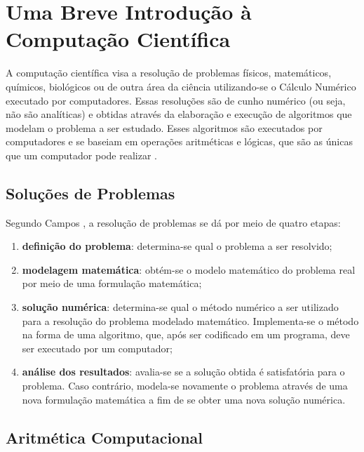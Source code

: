 \chapter{Uma Breve Introdução à Computação Científica}

    \label{cap:cientComp}

    A computação científica visa a resolução de problemas físicos, matemáticos, químicos, biológicos 
    ou de outra área da ciência utilizando-se o Cálculo Numérico executado por computadores. Essas resoluções
    são de cunho numérico (ou seja, não são analíticas) e obtidas através da elaboração e execução de algoritmos
    que modelam o problema a ser estudado. Esses algoritmos são executados por computadores e se baseiam em 
    operações aritméticas e lógicas, que são as únicas que um computador pode realizar \cite{fred}.

    \section{Soluções de Problemas}
    
        Segundo Campos \cite{fred}, a resolução de problemas se dá por meio de quatro etapas:
        \begin{enumerate}
            \item \textbf{definição do problema}: determina-se qual o problema a ser resolvido;
            \item \textbf{modelagem matemática}: obtém-se o modelo matemático do problema real por meio
            de uma formulação matemática;
            \item \textbf{solução numérica}: determina-se qual o método numérico a ser 
            utilizado para a resolução do problema modelado matemático. Implementa-se o método na forma de uma algoritmo, que, 
            após ser codificado em um programa, deve ser executado por um computador;
            \item \textbf{análise dos resultados}: avalia-se se a solução obtida é satisfatória para o problema. Caso 
            contrário, modela-se novamente o problema através de uma nova formulação matemática a fim de se 
            obter uma nova solução numérica.
        \end{enumerate}
    
    \section{Aritmética Computacional}
    
